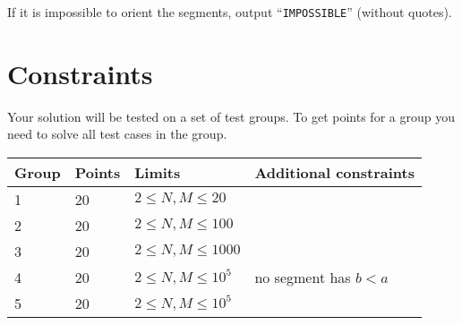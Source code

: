If it is impossible to orient the segments, output ``\texttt{IMPOSSIBLE}'' (without quotes).

\section*{Constraints}
Your solution will be tested on a set of test groups.
To get points for a group you need to solve all test cases in the group.

\noindent
\begin{tabular}{| l | l | l | l |}
\hline
\textbf{Group} & \textbf{Points} & \textbf{Limits} & \textbf{Additional constraints} \\ \hline
  1     & 20     & $2 \le N, M \le 20$ & \\ \hline
  2     & 20     & $2 \le N, M \le 100$ & \\ \hline
  3     & 20     & $2 \le N, M \le 1000$ & \\ \hline
  4     & 20     & $2 \le N, M \le 10^5$ & no segment has $b < a$ \\ \hline
  5     & 20     & $2 \le N, M \le 10^5$ & \\ \hline
\end{tabular}
